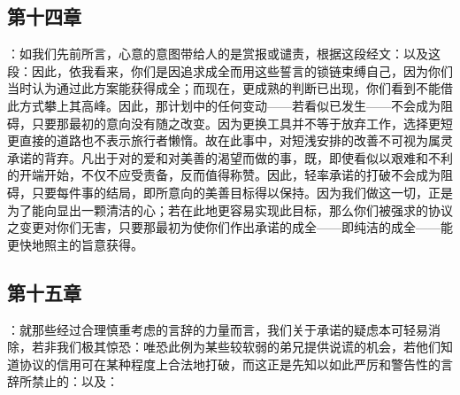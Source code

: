 
\subsection{第十四章}

\par

：如我们先前所言，心意的意图带给人的是赏报或谴责，根据这段经文：以及这段：因此，依我看来，你们是因追求成全而用这些誓言的锁链束缚自己，因为你们当时认为通过此方案能获得成全；而现在，更成熟的判断已出现，你们看到不能借此方式攀上其高峰。因此，那计划中的任何变动——若看似已发生——不会成为阻碍，只要那最初的意向没有随之改变。因为更换工具并不等于放弃工作，选择更短更直接的道路也不表示旅行者懒惰。故在此事中，对短浅安排的改善不可视为属灵承诺的背弃。凡出于对的爱和对美善的渴望而做的事，既，即使看似以艰难和不利的开端开始，不仅不应受责备，反而值得称赞。因此，轻率承诺的打破不会成为阻碍，只要每件事的结局，即所意向的美善目标得以保持。因为我们做这一切，正是为了能向显出一颗清洁的心；若在此地更容易实现此目标，那么你们被强求的协议之变更对你们无害，只要那最初为使你们作出承诺的成全——即纯洁的成全——能更快地照主的旨意获得。\par


\subsection{第十五章}

\par

：就那些经过合理慎重考虑的言辞的力量而言，我们关于承诺的疑虑本可轻易消除，若非我们极其惊恐：唯恐此例为某些较软弱的弟兄提供说谎的机会，若他们知道协议的信用可在某种程度上合法地打破，而这正是先知以如此严厉和警告性的言辞所禁止的：以及：\par


